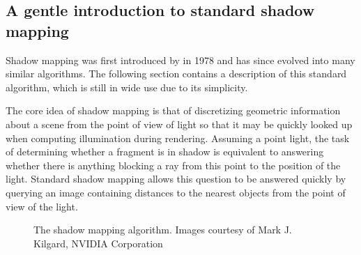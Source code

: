 \subsection{A gentle introduction to standard shadow mapping}

Shadow mapping was first introduced by \citet{Williams78castingcurved} in 1978 and has since evolved into many similar algorithms. The following section contains a description of this standard algorithm, which is still in wide use due to its simplicity.

The core idea of shadow mapping is that of discretizing geometric information about a scene from the point of view of  light so that it may be quickly looked up when computing illumination during rendering. Assuming a point light, the task of determining whether a fragment is in shadow is equivalent to answering whether there is anything blocking a ray from this point to the position of the light. Standard shadow mapping allows this question to be answered quickly by querying an image containing distances to the nearest objects from the point of view of the light.

\begin{figure}[ht!]
  \centering
  \caption{The shadow mapping algorithm. Images courtesy of Mark J. Kilgard, NVIDIA Corporation}
  \label{fig:ShadowMappingAlgorithm}
\end{figure}

